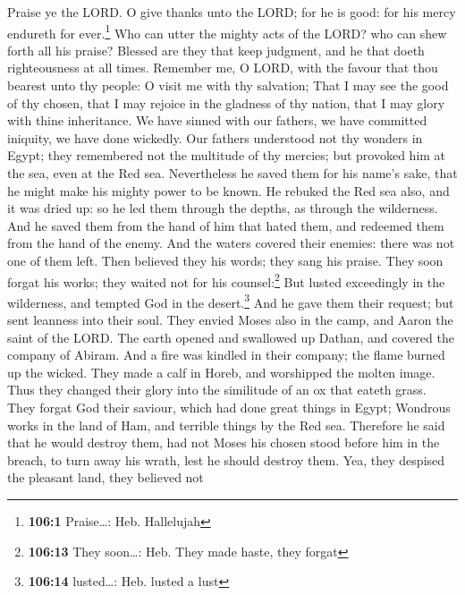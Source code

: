  Praise ye the LORD. O give thanks unto the LORD; for he
is good: for his mercy endureth for ever.\footnote{\textbf{106:1}
  Praise\ldots: Heb. Hallelujah}  Who can utter the mighty
acts of the LORD? who can shew forth all his praise? 
Blessed are they that keep judgment, and he that doeth righteousness at
all times.  Remember me, O LORD, with the favour that thou
bearest unto thy people: O visit me with thy salvation; 
That I may see the good of thy chosen, that I may rejoice in the
gladness of thy nation, that I may glory with thine inheritance.
 We have sinned with our fathers, we have committed
iniquity, we have done wickedly.  Our fathers understood
not thy wonders in Egypt; they remembered not the multitude of thy
mercies; but provoked him at the sea, even at the Red sea.
 Nevertheless he saved them for his name's sake, that he
might make his mighty power to be known.  He rebuked the
Red sea also, and it was dried up: so he led them through the depths, as
through the wilderness.  And he saved them from the hand
of him that hated them, and redeemed them from the hand of the enemy.
 And the waters covered their enemies: there was not one
of them left.  Then believed they his words; they sang
his praise.  They soon forgat his works; they waited not
for his counsel:\footnote{\textbf{106:13} They soon\ldots: Heb. They
  made haste, they forgat}  But lusted exceedingly in the
wilderness, and tempted God in the desert.\footnote{\textbf{106:14}
  lusted\ldots: Heb. lusted a lust}  And he gave them
their request; but sent leanness into their soul.  They
envied Moses also in the camp, and Aaron the saint of the LORD.
 The earth opened and swallowed up Dathan, and covered
the company of Abiram.  And a fire was kindled in their
company; the flame burned up the wicked.  They made a
calf in Horeb, and worshipped the molten image.  Thus
they changed their glory into the similitude of an ox that eateth grass.
 They forgat God their saviour, which had done great
things in Egypt;  Wondrous works in the land of Ham, and
terrible things by the Red sea.  Therefore he said that
he would destroy them, had not Moses his chosen stood before him in the
breach, to turn away his wrath, lest he should destroy them.
 Yea, they despised the pleasant land, they believed not
